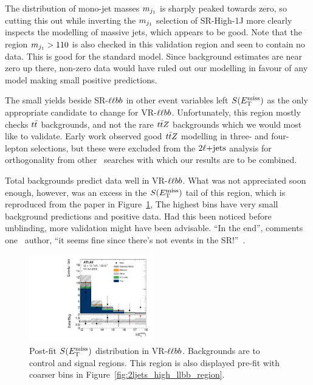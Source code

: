 The distribution of mono-jet masses $m_{j_1}$ is sharply peaked towards zero,
so cutting this out while inverting the $m_{j_1}$ selection of SR-High-1J
more clearly inspects the modelling of massive jets, which appears to be good.
Note that the region $m_{j_1} > 110$ is also checked in this validation region
and seen to contain no data.
This is good for the standard model.
Since background estimates are near zero up there, non-zero data would have
ruled out our modelling in favour of any model making small positive
predictions.

The small yields beside SR-$\llbb$ in other event variables left $\metsig$ as
the only appropriate candidate to change for VR-$\llbb$.
Unfortunately, this region mostly checks $t\bar t$ backgrounds, and not the
rare $t\bar t Z$ backgrounds which we would most like to validate.
Early work observed good $t\bar t Z$ modelling in three- and four- lepton
selections, but these were excluded from the $2\ell\mathrm{+jets}$ analysis for
orthogonality from other \atlas\ searches with which our results are to be
combined.

Total backgrounds predict data well in VR-$\llbb$.
What was not appreciated soon enough, however, was an excess in the $\metsig$
tail of this region, which is reproduced from the paper in
Figure~\ref{fig:2ljets_high_metsig_vrllbb_paper},
The highest bins have very small background predictions and positive data.
Had this been noticed before unblinding, more validation might have
been advisable.
``In the end'', comments one \atlas\ author,
``it seems fine since there's not events in the SR!''~\cite{comment2022vrllbb}.

\begin{figure}[tp]
\centering
\includegraphics[width=0.48\textwidth]{figures/2ljets_vr_llbb_met_sig.pdf}
\caption[
Post-fit $\metsig$ distribution in VR-$\llbb$
]{%
Post-fit $\metsig$ distribution in VR-$\llbb$.
Backgrounds are to control and signal regions.
This region is also displayed pre-fit with coarser bins in
Figure~\ref{fig:2ljets_high_llbb_region}.
}
\label{fig:2ljets_high_metsig_vrllbb_paper}
\end{figure}


